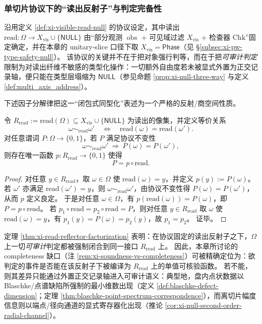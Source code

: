 \subsubsection{单切片协议下的“读出反射子”与判定完备性}\label{subsubsec:xi-read-reflector-completeness}
沿用定义 \ref{def:xi-visible-read-null} 的协议设定，其中读出 \(\mathrm{read}:\Omega\to X_{\mathrm{vis}}\cup\{\mathsf{NULL}\}\) 由“部分观测 \(\operatorname{obs}\) + 可见域过滤 \(X_{\mathrm{vis}}\) + 检查器 \(\mathrm{Chk}\)”固定确定，并在本章的 unitary-slice 口径下取 \(X_{\mathrm{vis}}=\mathsf{Phase}\)（见 \S\ref{subsec:xi-pw-type-safety-null}）。
该协议的关键并不在于把对象强行判等，而在于把\emph{可审计判定}限制为对读出纤维不敏感的类型化操作：一切额外自由度若未被显式外置为正交记录轴，便只能在类型层塌缩为 \(\mathsf{NULL}\)（参见命题 \ref{prop:xi-null-three-way} 与定义 \ref{def:multi_axis_address}）。
\par
下述因子分解律把这一“闭包式同型化”表述为一个严格的反射/商空间性质。

\begin{theorem}[读出反射子的因子分解律]\label{thm:xi-read-reflector-factorization}
令
\(
R_{\mathrm{read}}:=\mathrm{read}(\Omega)\subseteq X_{\mathrm{vis}}\cup\{\mathsf{NULL}\}
\)
为读出的像集，并定义等价关系
\[
\omega\sim_{\mathrm{read}}\omega'
\quad\Longleftrightarrow\quad
\mathrm{read}(\omega)=\mathrm{read}(\omega').
\]
对任意谓词 \(P:\Omega\to\{0,1\}\)，若 \(P\) 满足协议不变性
\[
\omega\sim_{\mathrm{read}}\omega'\ \Longrightarrow\ P(\omega)=P(\omega'),
\]
则存在唯一函数 \(p:R_{\mathrm{read}}\to\{0,1\}\) 使得
\[
P=p\circ \mathrm{read}.
\]
\end{theorem}

\begin{proof}
对任意 \(y\in R_{\mathrm{read}}\)，取 \(\omega\in\Omega\) 使 \(\mathrm{read}(\omega)=y\)，并定义 \(p(y):=P(\omega)\)。
若 \(\omega'\) 亦满足 \(\mathrm{read}(\omega')=y\)，则 \(\omega\sim_{\mathrm{read}}\omega'\)，由协议不变性得 \(P(\omega)=P(\omega')\)，从而 \(p\) 定义良定。
于是对任意 \(\omega\in\Omega\)，有 \(p(\mathrm{read}(\omega))=P(\omega)\)，即 \(P=p\circ\mathrm{read}\)。
若 \(p_1\circ\mathrm{read}=p_2\circ\mathrm{read}=P\)，则对任意 \(y\in R_{\mathrm{read}}\) 取 \(\omega\) 使 \(\mathrm{read}(\omega)=y\)，有 \(p_1(y)=P(\omega)=p_2(y)\)，故 \(p_1=p_2\)。
证毕。
\end{proof}

\begin{remark}\label{rem:xi-read-reflector-completeness}
定理 \ref{thm:xi-read-reflector-factorization} 表明：在协议固定的读出反射子之下，\(\Omega\) 上一切\emph{可审计}判定都被强制闭合到同一接口 \(R_{\mathrm{read}}\) 上。
因此，本章所讨论的 completeness 缺口（注 \ref{rem:xi-soundness-vs-completeness}）可被精确定位为：欲判定的事件是否能在该反射子下被编译为 \(R_{\mathrm{read}}\) 上的单值可核验函数。
若不能，则其差异只能通过外置正交记录轴进入可审计语义：典型地，盘内点状数据以 Blaschke/点谱缺陷所强制的最小维数出现（定义 \ref{def:blaschke-defect-dimension}；定理 \ref{thm:blaschke-point-spectrum-correspondence}），而离切片幅度信息则以端点/径向通道的显式寄存器化出现（推论 \ref{cor:xi-null-second-order-radial-channel}）。
\end{remark}

